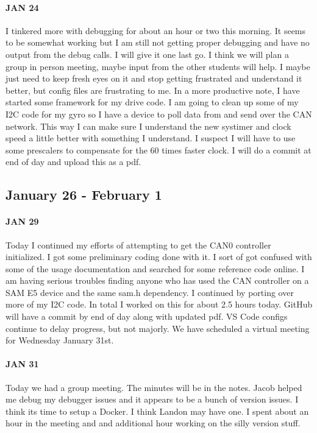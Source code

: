 \documentclass{article}
\begin{document}
\paragraph{JAN 24}
I tinkered more with debugging for about an hour or two this morning. It seems to be somewhat working but I am still not getting proper debugging and have no output from the debug calls. I will give it one last go. I think we will plan a group in person meeting, maybe input from the other students will help. I maybe just need to keep fresh eyes on it and stop getting frustrated and understand it better, but config files are frustrating to me. In a more productive note, I have started some framework for my drive code. I am going to clean up some of my I2C code for my gyro so I have a device to poll data from and send over the CAN network. This way I can make sure I understand the new systimer and clock speed a little better with something I understand. I suspect I will have to use some prescalers to compensate for the 60 times faster clock. I will do a commit at end of day and upload this as a pdf. 
\subsection{January 26 - February 1 }
\paragraph{JAN 29}
Today I continued my efforts of attempting to get the CAN0 controller initialized. I got some preliminary coding done with it. I sort of got confused with some of the usage documentation and searched for some reference code online. I am having serious troubles finding anyone who has used the CAN controller on a SAM E5 device and the same sam.h dependency. I continued by porting over more of my I2C code. In total I worked on this for about 2.5 hours today. GitHub will have a commit by end of day along with updated pdf. VS Code configs continue to delay progress, but not majorly. We have scheduled a virtual meeting for Wednesday January 31st.

\paragraph{JAN 31}
Today we had a group meeting. The minutes will be in the notes. Jacob helped me debug my debugger issues and it appears to be a bunch of version issues. I think its time to setup a Docker. I think Landon may have one. I spent about an hour in the meeting and and additional hour working on the silly version stuff. 
\end{document}

